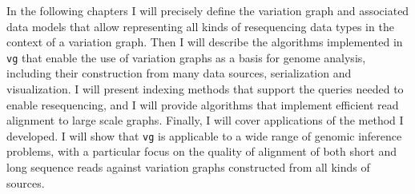 In the following chapters I will precisely define the variation graph and associated data models that allow representing all kinds of resequencing data types in the context of a variation graph.
Then I will describe the algorithms implemented in {\tt vg} that enable the use of variation graphs as a basis for genome analysis, including their construction from many data sources, serialization and visualization.
I will present indexing methods that support the queries needed to enable resequencing, and I will provide algorithms that implement efficient read alignment to large scale graphs.
Finally, I will cover applications of the method I developed.
I will show that {\tt vg} is applicable to a wide range of genomic inference problems, with a particular focus on the quality of alignment of both short and long sequence reads against variation graphs constructed from all kinds of sources.
